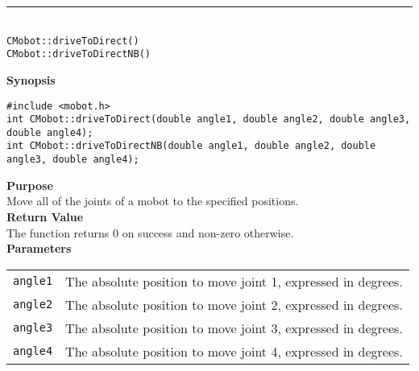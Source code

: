 \noindent
\vspace{5pt}
\rule{4.5in}{0.015in}\\
\noindent
{\LARGE \texttt{CMobot::driveToDirect()}}\\
{\LARGE \texttt{CMobot::driveToDirectNB()}}\\
{}

\noindent
{\bf Synopsis}
\vspace{-8pt}
\begin{verbatim}
#include <mobot.h>
int CMobot::driveToDirect(double angle1, double angle2, double angle3, double angle4);
int CMobot::driveToDirectNB(double angle1, double angle2, double angle3, double angle4);
\end{verbatim}

\noindent
{\bf Purpose}\\
Move all of the joints of a mobot to the specified positions.\\

\noindent
{\bf Return Value}\\
The function returns 0 on success and non-zero otherwise.\\

\noindent
{\bf Parameters}\\
\vspace{-0.1in}
\begin{description}
\item               
\begin{tabular}{p{15 mm}p{105 mm}}
\texttt{angle1} & The absolute position to move joint 1, expressed in degrees. \\
\texttt{angle2} & The absolute position to move joint 2, expressed in degrees. \\
\texttt{angle3} & The absolute position to move joint 3, expressed in degrees. \\
\texttt{angle4} & The absolute position to move joint 4, expressed in degrees. \\
\end{tabular}
\end{description}
\noindent

